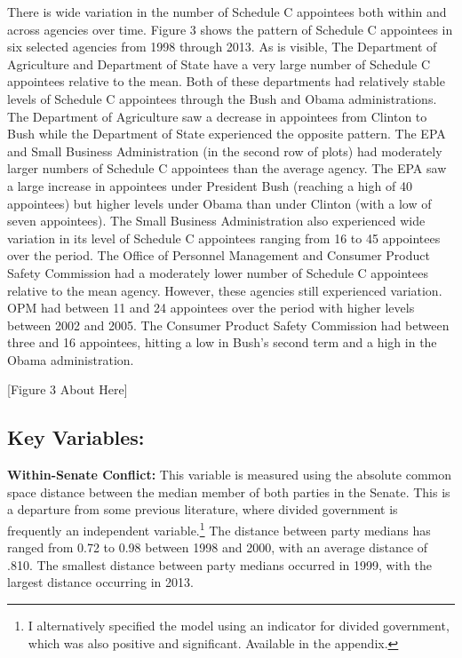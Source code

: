 \documentclass[12pt]{article}
\begin{document}
There is wide variation in the number of Schedule C appointees both within and across agencies over time. Figure 3 shows the pattern of Schedule C appointees in six selected agencies from 1998 through 2013. As is visible, The Department of Agriculture and Department of State have a very large number of Schedule C appointees relative to the mean. Both of these departments had relatively stable levels of Schedule C appointees through the Bush and Obama administrations. The Department of Agriculture saw a decrease in appointees from Clinton to Bush while the Department of State experienced the opposite pattern. The EPA and Small Business Administration (in the second row of plots) had moderately larger numbers of Schedule C appointees than the average agency. The EPA saw a large increase in appointees under President Bush (reaching a high of 40 appointees) but higher levels under Obama than under Clinton (with a low of seven appointees). The Small Business Administration also experienced wide variation in its level of Schedule C appointees ranging from 16 to 45 appointees over the period. The Office of Personnel Management and Consumer Product Safety Commission had a moderately lower number of Schedule C appointees relative to the mean agency. However, these agencies still experienced variation. OPM had between 11 and 24 appointees over the period with higher levels between 2002 and 2005. The Consumer Product Safety Commission had between three and 16 appointees, hitting a low in Bush's second term and a high in the Obama administration.  

\begin{center}[Figure 3 About Here]\end{center}

\subsection*{Key Variables:}

\noindent \textbf{Within-Senate Conflict:} This variable is measured using the absolute common space distance between the median member of both parties in the Senate. This is a departure from some previous literature, where divided government is frequently an independent variable.\footnote{I alternatively specified the model using an indicator for divided government, which was also positive and significant. Available in the appendix.} The distance between party medians has ranged from 0.72 to 0.98 between 1998 and 2000, with an average distance of .810. The smallest distance between party medians occurred in 1999, with the largest distance occurring in 2013. 
\end{document}
